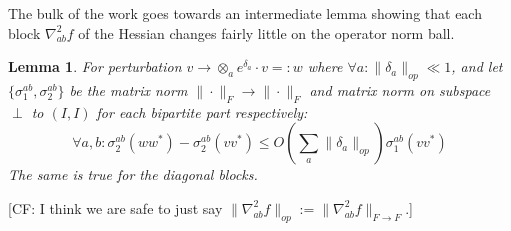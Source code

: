\documentclass{article}
\newtheorem{lemma}[theorem]{Lemma}
\newcommand{\CF}[1]{{\color{purple}[CF: #1]}}
\begin{document}
The bulk of the work goes towards an intermediate lemma showing that each block $\nabla^2_{ab} f$ of the Hessian changes fairly little on the operator norm ball.


\begin{lemma}\label{lem:block-perturbation-old}
For perturbation $v \to \otimes_{a} e^{\delta_{a}} \cdot v =: w$ where $\forall a: \|\delta_{a}\|_{op} \ll 1$, and let $\{\sigma_{1}^{ab}, \sigma_{2}^{ab}\}$ be the matrix norm $\|\cdot\|_{F} \to \|\cdot\|_{F}$ and matrix norm on subspace $\perp$ to $(I,I)$ for each bipartite part respectively:
\[ \forall a,b: \sigma_{2}^{ab}(w w^{*}) - \sigma_{2}^{ab}(v v^{*}) \leq O \left( \sum_{a} \|\delta_{a}\|_{op}  \right) \sigma_{1}^{ab}(v v^{*})   \]
The same is true for the diagonal blocks.
\end{lemma}

\CF{I think we are safe to just say $\|\nabla^2_{ab}f\|_{op}:=\|\nabla^2_{ab}f\|_{F\to F}$.}
\end{document}
